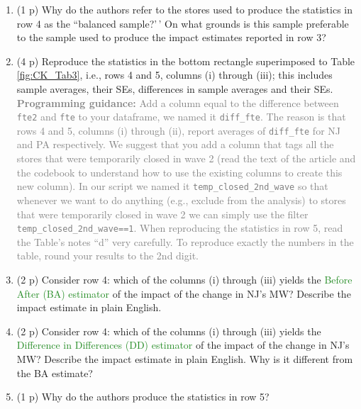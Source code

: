 \documentclass[
]{article}
\begin{document}
\begin{enumerate}
\def\labelenumi{\alph{enumi}.}
\item
  (1 p) Why do the authors refer to the stores used to produce the
  statistics in row 4 as the ``balanced sample?'\,' On what grounds is
  this sample preferable to the sample used to produce the impact
  estimates reported in row 3?
\item
  (4 p) Reproduce the statistics in the bottom rectangle superimposed to
  Table \ref{fig:CK_Tab3}, i.e., rows 4 and 5, columns (i) through
  (iii); this includes sample averages, their SEs, differences in sample
  averages and their SEs.
  \textcolor{gray}{\textbf{Programming guidance:} Add a column equal to the difference between \texttt{fte2} and \texttt{fte} to your dataframe, we named it \texttt{diff\_fte}. The reason is that rows 4 and 5, columns (i) through (ii), report averages of \texttt{diff\_fte} for NJ and PA respectively. We suggest that you add a column that tags all the stores that were temporarily closed in wave 2 (read the text of the article and the codebook to understand how to use the existing columns to create this new column). In our script we named it \texttt{temp\_closed\_2nd\_wave} so that whenever we want to do anything (e.g., exclude from the analysis) to stores that were temporarily closed in wave 2 we can simply use the filter \texttt{temp\_closed\_2nd\_wave==1}. When reproducing the statistics in row 5, read the Table's notes ``d'' very carefully. To reproduce exactly the numbers in the table, round your results to the 2nd digit.}
\item
  (2 p) Consider row 4: which of the columns (i) through (iii) yields
  the \textcolor{ForestGreen}{Before After (BA) estimator} of the impact
  of the change in NJ's MW? Describe the impact estimate in plain
  English.
\item
  (2 p) Consider row 4: which of the columns (i) through (iii) yields
  the \textcolor{ForestGreen}{Difference in Differences (DD) estimator}
  of the impact of the change in NJ's MW? Describe the impact estimate
  in plain English. Why is it different from the BA estimate?
\item
  (1 p) Why do the authors produce the statistics in row 5?
\end{enumerate}
\end{document}
